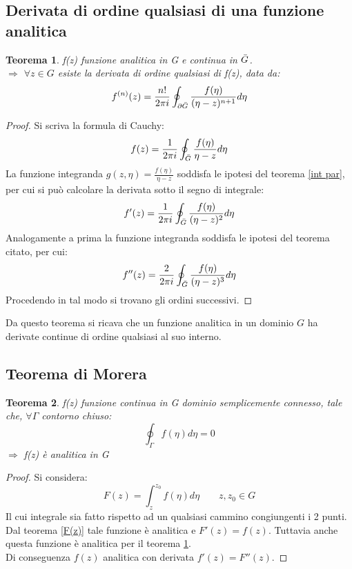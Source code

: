\documentclass[twoside]{article}
\newtheorem{theorem}{Teorema}[section]
\begin{document}
\subsection{Derivata di ordine qualsiasi di una funzione analitica}
\begin{theorem}\label{5.derivate}
f(z) funzione analitica in G e continua in $\Bar{G}$.\\
$\Longrightarrow$ $\forall z \in G$ esiste la derivata di ordine qualsiasi di f(z), data da:
\begin{equation}
    f^{(n)}(z)=\frac{n!}{2\pi i}\oint_{\partial \Bar{G}}\frac{f(\eta)}{(\eta-z)^{n+1}}d\eta
\end{equation}
\end{theorem}
\begin{proof}
Si scriva la formula di Cauchy:
\begin{equation}\label{4.5.2}
    f(z)=\frac{1}{2\pi i}\oint_{\Bar{G}}\frac{f(\eta)}{\eta-z}d\eta
\end{equation}
La funzione integranda $g(z,\eta)=\frac{f(\eta)}{\eta-z}$ soddisfa le ipotesi del teorema \ref{int par}, per cui si può calcolare la derivata sotto il segno di integrale:
\begin{equation}
    f'(z)=\frac{1}{2\pi i}\oint_{\Bar{G}}\frac{f(\eta)}{(\eta-z)^2}d\eta
\end{equation}
Analogamente a prima la funzione integranda soddisfa le ipotesi del teorema citato, per cui:
\begin{equation}
    f''(z)=\frac{2}{2\pi i}\oint_{\Bar{G}}\frac{f(\eta)}{(\eta-z)^3}d\eta
\end{equation}
Procedendo in tal modo si trovano gli ordini successivi.
\end{proof}
Da questo teorema si ricava che un funzione analitica in un dominio $G$ ha derivate continue di ordine qualsiasi al suo interno.

\subsection{Teorema di Morera}
\begin{theorem}
f(z) funzione continua in G dominio semplicemente connesso, tale che, $\forall \Gamma$ contorno chiuso:
\begin{equation}
    \oint_{\Gamma} f(\eta)d\eta=0
\end{equation}
$\Longrightarrow$ f(z) è analitica in G
\end{theorem}
\begin{proof}
Si considera:
\begin{equation}
    F(z)=\int_z^{z_0} f(\eta)d\eta \qquad z,z_0 \in G
\end{equation}
Il cui integrale sia fatto rispetto ad un qualsiasi cammino congiungenti i 2 punti. Dal teorema \ref{F(z)} tale funzione è analitica e $F'(z)=f(z)$. Tuttavia anche questa funzione è analitica per il teorema \ref{5.derivate}.\\
Di conseguenza $f(z)$ analitica con derivata $f'(z)=F''(z)$.
\end{proof}
\end{document}
